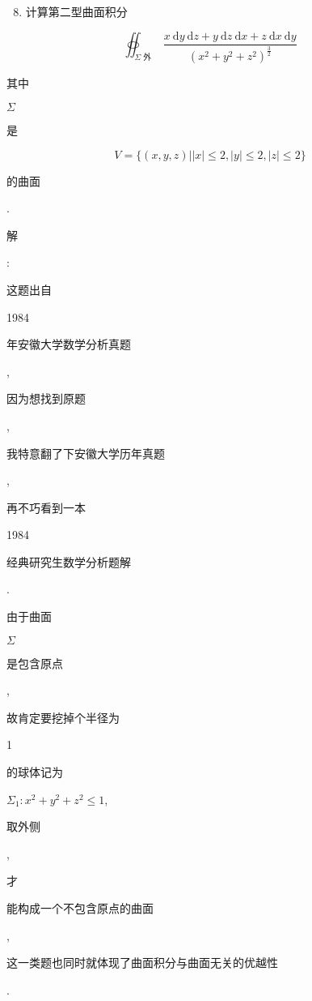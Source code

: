 \documentclass[10pt]{article}
\begin{document}
\begin{enumerate}
  \setcounter{enumi}{7}
  \item \begin{CJK}{UTF8}{mj}计算第二型曲面积分\end{CJK}
\end{enumerate}
$$
\oiint_{\Sigma \text { 外 }} \frac{x \mathrm{~d} y \mathrm{~d} z+y \mathrm{~d} z \mathrm{~d} x+z \mathrm{~d} x \mathrm{~d} y}{\left(x^{2}+y^{2}+z^{2}\right)^{\frac{3}{2}}}
$$
\begin{CJK}{UTF8}{mj}其中\end{CJK} $\Sigma$ \begin{CJK}{UTF8}{mj}是\end{CJK}
$$
V=\{(x, y, z)|| x|\leq 2,| y|\leq 2,| z \mid \leq 2\}
$$
\begin{CJK}{UTF8}{mj}的曲面\end{CJK}.

\begin{CJK}{UTF8}{mj}解\end{CJK}: \begin{CJK}{UTF8}{mj}这题出自\end{CJK} 1984 \begin{CJK}{UTF8}{mj}年安徽大学数学分析真题\end{CJK}, \begin{CJK}{UTF8}{mj}因为想找到原题\end{CJK}, \begin{CJK}{UTF8}{mj}我特意翻了下安徽大学历年真题\end{CJK}, \begin{CJK}{UTF8}{mj}再不巧看到一本\end{CJK} 1984 \begin{CJK}{UTF8}{mj}经典研究生数学分析题解\end{CJK}.

\begin{CJK}{UTF8}{mj}由于曲面\end{CJK} $\Sigma$ \begin{CJK}{UTF8}{mj}是包含原点\end{CJK}, \begin{CJK}{UTF8}{mj}故肯定要挖掉个半径为\end{CJK} 1 \begin{CJK}{UTF8}{mj}的球体记为\end{CJK} $\Sigma_{1}: x^{2}+y^{2}+z^{2} \leq 1$, \begin{CJK}{UTF8}{mj}取外侧\end{CJK}, \begin{CJK}{UTF8}{mj}才\end{CJK} \begin{CJK}{UTF8}{mj}能构成一个不包含原点的曲面\end{CJK}, \begin{CJK}{UTF8}{mj}这一类题也同时就体现了曲面积分与曲面无关的优越性\end{CJK}.
\end{document}
